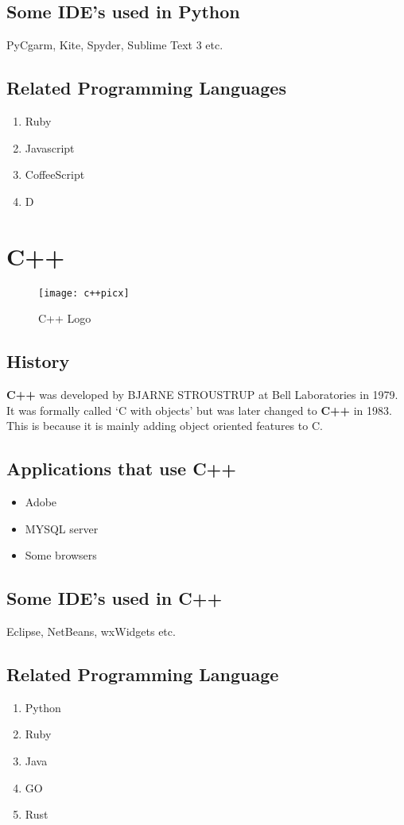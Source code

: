 \documentclass{article}
\begin{document}
         \subsection{Some IDE's used in Python}
         PyCgarm, Kite, Spyder, Sublime Text 3 etc.
         \subsection{Related Programming Languages}
         \begin{enumerate}
         	\item Ruby
         	\item Javascript
         	\item CoffeeScript
         	\item D
         \end{enumerate}
     \pagebreak
        \section{C++}
\begin{figure}[t]
	\centering
	\texttt{[image: c++picx]}
	\caption{C++ Logo}
	\label{C++ Logo}
\end{figure}
        \subsection{History}
        \textbf{C++} was developed by BJARNE STROUSTRUP at Bell Laboratories in 1979. It was formally called ‘C with objects’ but was later changed to \textbf{C++} in 1983. This is because it is mainly adding object oriented features to C.
        \subsection{Applications that use C++}
        \begin{itemize}
        	\item Adobe
        	\item MYSQL server
        	\item Some browsers
        \end{itemize}
    \subsection{Some IDE's used in C++}
    Eclipse, NetBeans, wxWidgets etc.
    \subsection{Related Programming Language}
    \begin{enumerate}
    	\item Python
    	\item Ruby
    	\item Java
    	\item GO
    	\item Rust
    \end{enumerate}
\end{document}
